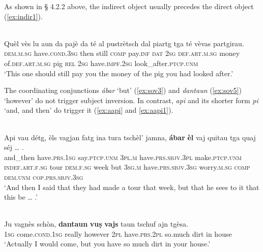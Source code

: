 As shown in § 4.2.2 above, the indirect object usually precedes the direct object (\ref{ex:indir1}).

\ea
\label{ex:indir1}
\\
\gll    Quèl vès lu aun da pajè {\ob}da té{\cb} {\ob}al pustrètsch dal piartg tga té vèvas partgirau{\cb}. \\
\textsc{dem.m.sg} have.\textsc{cond.3sg} then still \textsc{comp} pay.\textsc{inf} \textsc{dat} \textsc{2sg} \textsc{def.art.m.sg} money of.\textsc{def.art.m.sg} pig \textsc{rel} \textsc{2sg} have.\textsc{impf.2sg} look\_after.\textsc{ptcp.unm}\\
\glt `This one should still pay you the money of the pig you had looked after.'
\z

The coordinating conjunctions \textit{ábar} `but' (\ref{ex:sov3}) and \textit{dantaun} (\ref{ex:sov5}) `however' do not trigger subject inversion. In contrast, \textit{api} and its shorter form \textit{pi} `and, and then' do trigger it (\ref{ex:aapi} and \ref{ex:aapi1}).

\ea
\label{ex:sov3}
\\
\gll Api vau détg, èls vagjan fatg ina tura tschèl’ jamna, \textbf{ábar} \textbf{èl} vaj quitau tga quaj séj … .\\  
and\_then have.\textsc{prs.1sg} say.\textsc{ptcp.unm} \textsc{3pl.m} have.\textsc{prs.sbjv.3pl} make.\textsc{ptcp.unm} \textsc{indef.art.f.sg} tour  \textsc{dem.f.sg} week but \textsc{3sg.m} have.\textsc{prs.sbjv.3sg} worry.\textsc{m.sg} \textsc{comp} \textsc{dem.unm} \textsc{cop.prs.sbjv.3sg} \\
\glt `And then I said that they had made a tour that week, but that he sees to it that this be … .'
\z

\ea\label{ex:sov5}
 {\citealt[18]{Berther1998}}\\
\gll    Ju vagnès schòn, \textbf{dantaun} \textbf{vuṣ} \textbf{vajs} taun tschuf ajn tgèsa.\\
\textsc{1sg} come.\textsc{cond.1sg} really however \textsc{2pl} have.\textsc{prs.2pl} so.much dirt in house\\
\glt `Actually I would come, but you have so much dirt in your house.'
\z

